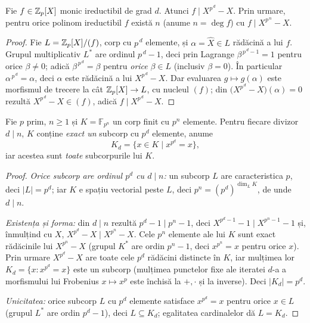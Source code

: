 \begin{teorema}[ireductibile și $X^{p^n}-X$]\label{teo:xpnx}
Fie $f\in\mathbb{Z}_p[X]$ monic ireductibil de grad $d$. Atunci $f\mid X^{p^{\,d}}-X$. Prin urmare, pentru orice polinom ireductibil $f$ există $n$ (anume $n=\deg f$) cu $f\mid X^{p^{\,n}}-X$.
\end{teorema}

\begin{proof}
Fie $L=\mathbb{Z}_p[X]/(f)$, corp cu $p^{\,d}$ elemente, și $\alpha=\widehat X\in L$ rădăcină a lui $f$. Grupul multiplicativ $L^*$ are ordinul $p^{\,d}-1$, deci prin Lagrange $\beta^{\,p^{\,d}-1}=1$ pentru orice $\beta\neq0$; adică $\beta^{\,p^{\,d}}=\beta$ pentru \emph{orice} $\beta\in L$ (inclusiv $\beta=0$). În particular $\alpha^{\,p^{\,d}}=\alpha$, deci $\alpha$ este rădăcină a lui $X^{p^{\,d}}-X$. Dar evaluarea $g\mapsto g(\alpha)$ este morfismul de trecere la cât $\mathbb{Z}_p[X]\to L$, cu nucleul $(f)$; din $\bigl(X^{p^{\,d}}-X\bigr)(\alpha)=0$ rezultă $X^{p^{\,d}}-X\in(f)$, adică $f\mid X^{p^{\,d}}-X$.
\end{proof}

\begin{propozitie}\label{prop:subcorpuri}
Fie $p$ prim, $n\ge1$ și $K=\mathbb F_{p^n}$ un corp finit cu $p^n$ elemente. Pentru fiecare divizor $d\mid n$, $K$ conține \emph{exact un} subcorp cu $p^d$ elemente, anume
\[
K_d=\{x\in K\mid x^{p^d}=x\},
\]
iar acestea sunt \emph{toate} subcorpurile lui $K$.
\end{propozitie}
\begin{proof}
\emph{Orice subcorp are ordinul $p^d$ cu $d\mid n$:} un subcorp $L$ are caracteristica $p$, deci $|L|=p^d$; iar $K$ e spațiu vectorial peste $L$, deci $p^n=(p^d)^{\dim_L K}$, de unde $d\mid n$.

\emph{Existența și forma:} din $d\mid n$ rezultă $p^d-1\mid p^n-1$, deci $X^{p^d-1}-1\mid X^{p^n-1}-1$ și, înmulțind cu $X$, $X^{p^d}-X\mid X^{p^n}-X$. Cele $p^n$ elemente ale lui $K$ sunt exact rădăcinile lui $X^{p^n}-X$ (grupul $K^*$ are ordin $p^n-1$, deci $x^{p^n}=x$ pentru orice $x$). Prin urmare $X^{p^d}-X$ are toate cele $p^d$ rădăcini distincte în $K$, iar mulțimea lor $K_d=\{x:x^{p^d}=x\}$ este un subcorp (mulțimea punctelor fixe ale iteratei $d$-a a morfismului lui Frobenius $x\mapsto x^p$ este închisă la $+,\cdot$ și la inverse). Deci $|K_d|=p^d$.

\emph{Unicitatea:} orice subcorp $L$ cu $p^d$ elemente satisface $x^{p^d}=x$ pentru orice $x\in L$ (grupul $L^*$ are ordin $p^d-1$), deci $L\subseteq K_d$; egalitatea cardinalelor dă $L=K_d$.
\end{proof}


